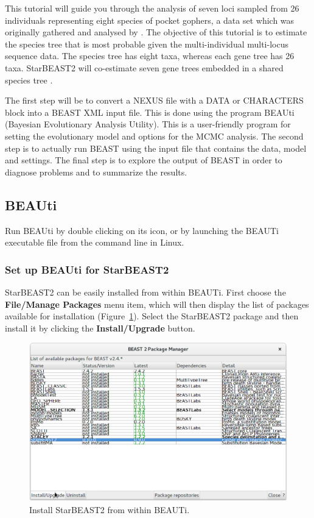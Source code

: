 \documentclass{article}
\begin{document}
This tutorial will guide you through the analysis of seven loci sampled from 26
individuals representing eight species of pocket gophers, a data set which was
originally gathered and analysed by
\cite{belfiore2008multilocus}. The objective of this tutorial is to estimate the
species tree that is most probable given the multi-individual multi-locus
sequence data. The species tree has eight taxa, whereas each gene tree has 26
taxa. StarBEAST2 will co-estimate seven gene trees embedded in a shared species
tree \citep{Heled01032010}.

The first step will be to convert a NEXUS file with a DATA or CHARACTERS block
into a BEAST XML input file. This is done using the program BEAUti (Bayesian
Evolutionary Analysis Utility). This is a user-friendly program for setting the
evolutionary model and options for the MCMC analysis. The second step is to
actually run BEAST using the input file that contains the data, model and
settings. The final step is to explore the output of BEAST in order to diagnose
problems and to summarize the results.

\subsection*{BEAUti}

Run BEAUti by double clicking on its icon, or by launching the BEAUTi executable
file from the command line in Linux.

\subsubsection*{Set up BEAUti for StarBEAST2}

StarBEAST2 can be easily installed from within BEAUTi. First choose the
\textbf{File/Manage Packages} menu item, which will then display the list of
packages available for installation (Figure~\ref{fig:managePackages}). Select
the StarBEAST2 package and then install it by clicking the
\textbf{Install/Upgrade} button.

\begin{figure}[htb!]
\centering
\includegraphics[width=\textwidth]{figures/beauti-install.png}
\caption{Install StarBEAST2 from within BEAUTi.}
\label{fig:managePackages}
\end{figure}
\end{document}
